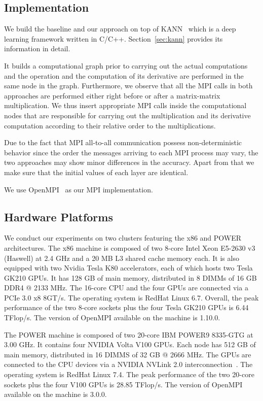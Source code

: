 \subsection{Implementation}
\label{sec:altsplit_software}
We build the baseline and our approach on top of KANN~\cite{kann} which is a 
deep learning framework written in C/C++. Section~\ref{sec:kann} provides its 
information in detail. 

It builds a computational graph prior to carrying out the actual computations 
and the operation and the computation of its derivative are performed in the same 
node in the graph. Furthermore, we observe that all the MPI calls in both 
approaches are performed either right before or after a matrix-matrix 
multiplication. We thus insert appropriate MPI calls inside the computational 
nodes that are responsible for carrying out the multiplication and its 
derivative computation according to their relative order to the multiplications.

Due to the fact that MPI all-to-all communication possess non-deterministic 
behavior since the order the messages arriving to each MPI process may vary, the 
two approaches may show minor differences in the accuracy. Apart from that we 
make sure that the initial values of each layer are identical. 

We use OpenMPI~\cite{openmpi, openmpi1} as our MPI implementation.

\subsection{Hardware Platforms}
\label{sec:altsplit_platform}
We conduct our experiments on two clusters featuring the x86 and POWER 
architectures.
The x86 machine is composed of two 8-core Intel Xeon
\textregistered E5-2630 v3 (Haswell) at 2.4 GHz and a 20 MB L3 shared cache 
memory each.  It is also equipped with two Nvidia Tesla K80 accelerators, each 
of which hosts two Tesla GK210 GPUs.
It has 128 GB of main memory, distributed in 8 DIMMs of 16 GB DDR4 @ 2133 MHz.
The 16-core CPU and the four GPUs are connected via a PCIe 3.0 x8 8GT/s.
The operating system is RedHat Linux 6.7.
Overall, the peak performance of the two 8-core sockets plus the four Tesla 
GK210 GPUs is 6.44 TFlop/s. The version of OpenMPI available on the machine is 
1.10.0.

The POWER machine is composed of two 20-core IBM POWER9 8335-GTG at 3.00 GHz.  
It contains four NVIDIA Volta V100 GPUs.  
Each node has 512 GB of main memory, distributed in 16 DIMMS of 32 GB @ 2666 
MHz.  The GPUs are connected to the CPU devices via a NVIDIA NVLink 2.0 
interconnection~\cite{nvlink}.  The operating system is RedHat Linux 7.4.  The 
peak performance of the two 20-core sockets plus the four V100 GPUs is 28.85 
TFlop/s. The version of OpenMPI available on the machine is 3.0.0.
